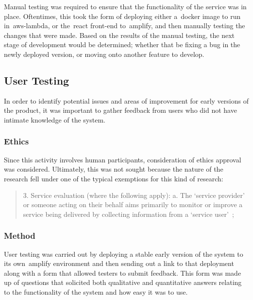 Manual testing was required to ensure that the functionality of the service was in place.
Oftentimes, this took the form of deploying either a~\gls{docker} image
to run in~\gls{aws-lambda}, or the~\gls{react} front-end to~\gls{amplify}, and
then manually testing the changes that were made.
Based on the results of the manual testing, the next stage of development would be determined;
whether that be fixing a bug in the newly deployed version, or moving onto another feature to develop.

\subsection{User Testing}\label{subsec:user-testing}

In order to identify potential issues and areas of improvement for early versions of the product,
it was important to gather feedback from users who did not have intimate knowledge of the system.

\subsubsection{Ethics}\label{subsubsec:ethics}

Since this activity involves human participants, consideration of ethics approval was considered.
Ultimately,
this was not sought
because the nature of the research fell under one of the typical exemptions for this kind of research:

\begin{quotation}
    3.
    Service evaluation (where the following apply):
    a.
    The ‘service provider’
    or someone acting on their behalf aims primarily
    to monitor or improve a service being delivered by collecting information from a `service user'~\citep{qmul_2023};
\end{quotation}

\subsubsection{Method}\label{subsubsec:method}

User testing was carried out
by deploying a stable early version of the system to its own~\gls{amplify} environment
and then sending out a link to that deployment along with a form that allowed testers to submit feedback.
This form was made up of questions
that solicited both qualitative and quantitative answers relating to the functionality of the system
and how easy it was to use.

